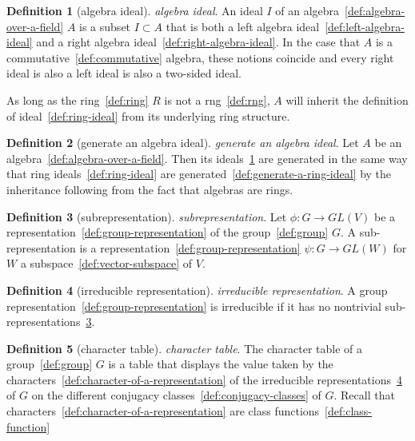\documentclass[12pt,a4paper]{article}
\theoremstyle{definition}
\newtheorem{definition}{Definition}
\begin{document}
\begin{definition}[algebra ideal]\label{def:algebra-ideal}
\emph{algebra ideal}. An ideal $I$ of an algebra~\ref{def:algebra-over-a-field} $A$ is a subset $I\subset A$ that is both a left algebra ideal~\ref{def:left-algebra-ideal} and a right algebra ideal~\ref{def:right-algebra-ideal}. In the case that $A$ is a commutative~\ref{def:commutative} algebra, these notions coincide and every right ideal is also a left ideal is also a two-sided ideal.

As long as the ring~\ref{def:ring} $R$ is not a rng~\ref{def:rng}, $A$ will inherit the definition of ideal~\ref{def:ring-ideal} from its underlying ring structure.
\end{definition}

\begin{definition}[generate an algebra ideal]\label{def:generate-an-algebra-ideal}
\emph{generate an algebra ideal}. Let $A$ be an algebra~\ref{def:algebra-over-a-field}. Then its ideals~\ref{def:algebra-ideal} are generated in the same way that ring ideals~\ref{def:ring-ideal} are generated~\ref{def:generate-a-ring-ideal} by the inheritance following from the fact that algebras are rings.
\end{definition}

\begin{definition}[subrepresentation]\label{def:subrepresentation}
\emph{subrepresentation}. Let $\phi:G\to GL(V)$ be a representation~\ref{def:group-representation} of the group~\ref{def:group} $G$. A sub-representation is a representation~\ref{def:group-representation} $\psi:G\to GL(W)$ for $W$ a subspace~\ref{def:vector-subspace} of $V$.
\end{definition}

\begin{definition}[irreducible representation]\label{def:irreducible-representation}
\emph{irreducible representation}. A group representation~\ref{def:group-representation} is irreducible if it has no nontrivial sub-representations~\ref{def:subrepresentation}.
\end{definition}

\begin{definition}[character table]\label{def:character-table}
\emph{character table}. The character table of a group~\ref{def:group} $G$ is a table that displays the value taken by the characters~\ref{def:character-of-a-representation} of the irreducible representations~\ref{def:irreducible-representation} of $G$ on the different conjugacy classes~\ref{def:conjugacy-classes} of $G$. Recall that characters~\ref{def:character-of-a-representation} are class functions~\ref{def:class-function}
\end{definition}
\end{document}

